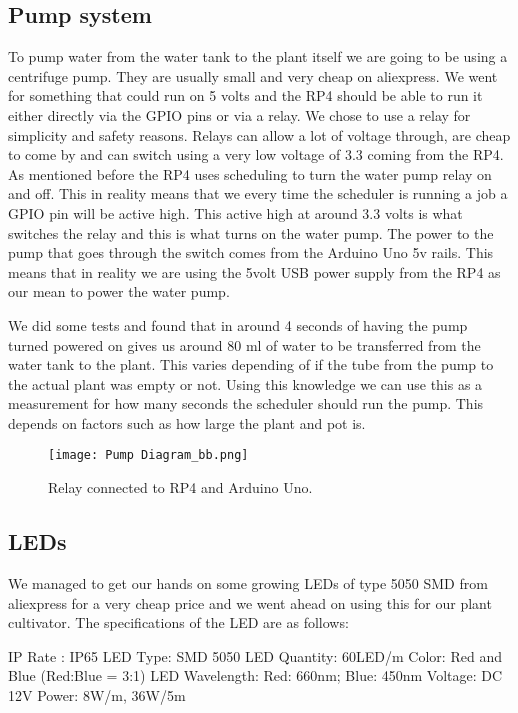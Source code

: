 \documentclass[a4paper,12pt,twoside,openright,titlepage]{book}
\begin{document}
\subsection{Pump system}
To pump water from the water tank to the plant itself we are going to be using a centrifuge pump. They are usually small and very cheap on aliexpress. We went for something that could run on 5 volts and the RP4 should be able to run it either directly via the GPIO pins or via a relay.
We chose to use a relay for simplicity and safety reasons. Relays can allow a lot of voltage through, are cheap to come by and can switch using a very low voltage of 3.3 coming from the RP4.
As mentioned before the RP4 uses scheduling to turn the water pump relay on and off. This in reality means that we every time the scheduler is running a job a GPIO pin will be active high. This active high at around 3.3 volts is what switches the relay and this is what turns on the water pump. The power to the pump that goes through the switch comes from the Arduino Uno 5v rails. This means that in reality we are using the 5volt USB power supply from the RP4 as our mean to power the water pump.

We did some tests and found that in around 4 seconds of having the pump turned powered on gives us  around 80 ml of water to be transferred from the water tank to the plant. This varies depending of if the tube from the pump to the actual plant was empty or not.
Using this knowledge we can use this as a measurement for how many seconds the scheduler should run the pump. This depends on factors such as how large the plant and pot is.

\begin{figure}[h]
    \texttt{[image: Pump Diagram\_bb.png]}
    \caption{Relay connected to RP4 and Arduino Uno.}
    \label{LED_diagram}
\end{figure}

\subsection{LEDs}

We managed to get our hands on some growing LEDs of type 5050 SMD from aliexpress for a very cheap price and we went ahead on using this for our plant cultivator. The specifications of the LED are as follows:

IP Rate : IP65
LED Type: SMD 5050
LED Quantity: 60LED/m 
Color: Red and Blue (Red:Blue = 3:1)
LED Wavelength: Red: 660nm; Blue: 450nm
Voltage: DC 12V
Power: 8W/m, 36W/5m
\end{document}
